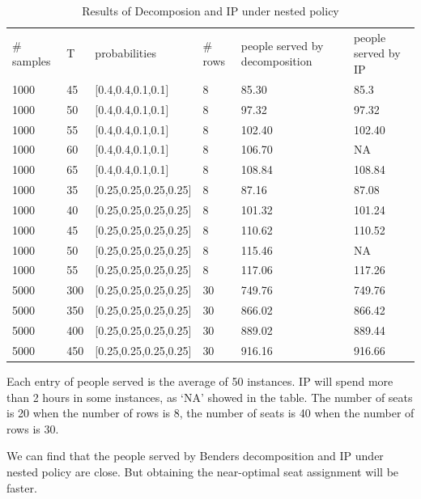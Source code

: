 \begin{table}[ht]
    \caption{Results of Decomposion and IP under nested policy}
    \begin{tabular}{|l|l|l|l|l|l|}
    \hline
    \# samples & T & probabilities & \# rows & people served by decomposition & people served by IP \\
    1000  & 45  & [0.4,0.4,0.1,0.1] & 8 & 85.30 & 85.3 \\
    1000  & 50  & [0.4,0.4,0.1,0.1] & 8 & 97.32 & 97.32 \\
    1000  & 55  & [0.4,0.4,0.1,0.1] & 8 & 102.40 & 102.40  \\ %
    1000  & 60  & [0.4,0.4,0.1,0.1] & 8 & 106.70 & NA  \\
    1000  & 65  & [0.4,0.4,0.1,0.1] & 8 & 108.84 & 108.84 \\
    \hline
    1000  & 35  & [0.25,0.25,0.25,0.25] & 8 & 87.16 & 87.08 \\
    1000  & 40  & [0.25,0.25,0.25,0.25] & 8 & 101.32 & 101.24 \\
    1000  & 45  & [0.25,0.25,0.25,0.25] & 8 & 110.62 & 110.52 \\
    1000  & 50  & [0.25,0.25,0.25,0.25] & 8 & 115.46 & NA \\
    1000  & 55  & [0.25,0.25,0.25,0.25] & 8 & 117.06 & 117.26 \\
    \hline
    5000  & 300  & [0.25,0.25,0.25,0.25] & 30 & 749.76 & 749.76 \\
    5000  & 350  & [0.25,0.25,0.25,0.25] & 30 & 866.02 & 866.42 \\
    5000  & 400  & [0.25,0.25,0.25,0.25] & 30 & 889.02 & 889.44 \\
    5000  & 450  & [0.25,0.25,0.25,0.25] & 30 & 916.16 & 916.66 \\
    \hline
    \end{tabular}
\end{table}

Each entry of people served is the average of 50 instances.
IP will spend more than 2 hours in some instances, as `NA' showed in the table.
The number of seats is 20 when the number of rows is 8, the number of seats is 40 when the number of rows is 30.

We can find that the people served by Benders decomposition and IP under nested policy are close. But obtaining the near-optimal seat assignment will be faster.


